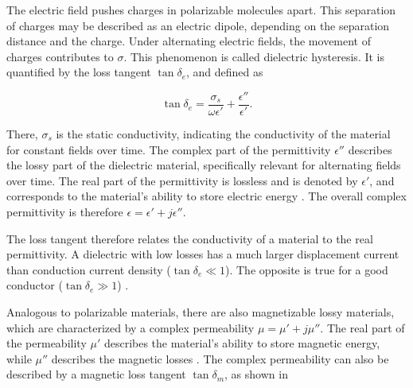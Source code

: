 The electric field pushes charges in polarizable molecules apart. This separation of charges may be described as an electric dipole, depending on the separation distance and the charge. Under alternating electric fields, the movement of charges contributes to $\sigma$. This phenomenon is called dielectric hysteresis. It is quantified by the loss tangent $\tan\delta_e$, and defined as \cite[pp.~73-74]{Balanis_2012}

\begin{equation}
	\tan\delta_e = \frac{\sigma_s}{\omega\epsilon'}+\frac{\epsilon''}{\epsilon'}.
	\label{eqn:loss_tangent_permittivity}
\end{equation}

There, $\sigma_s$ is the static conductivity, indicating the conductivity of the material for constant fields over time. The complex part of the permittivity $\epsilon''$ describes the lossy part of the dielectric material, specifically relevant for alternating fields over time. The real part of the permittivity is lossless and is denoted by $\epsilon'$, and corresponds to the material's ability to store electric energy \cite{Kruželák_Kvasničáková_Džuganová_Dosoudil_Hudec_Krump_2024}. The overall complex permittivity is therefore $\epsilon=\epsilon'+j\epsilon''$.

The loss tangent therefore relates the conductivity of a material to the real permittivity. A dielectric with low losses has a much larger displacement current than conduction current density ($\tan\delta_e \ll 1$). The opposite is true for a good conductor ($\tan\delta_e \gg 1$) \cite{Balanis_2012}.


Analogous to polarizable materials, there are also magnetizable lossy materials, which are characterized by a complex permeability $\mu=\mu'+j\mu''$. The real part of the permeability $\mu'$ describes the material's ability to store magnetic energy, while $\mu''$ describes the magnetic losses  \cite{Kruželák_Kvasničáková_Džuganová_Dosoudil_Hudec_Krump_2024}. The complex permeability can also be described by a magnetic loss tangent $\tan{\delta_m}$, as shown in

